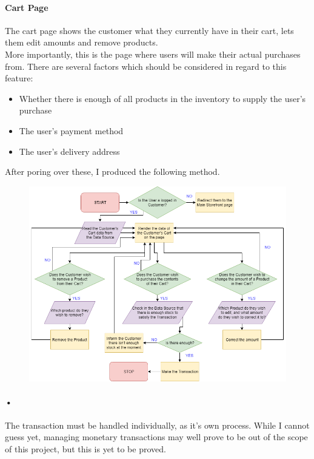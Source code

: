 ﻿\documentclass{article}
\begin{document}
    \paragraph{Cart Page}
    The cart page shows the customer what they currently have in their cart, lets them edit amounts  and remove products.\\
    More importantly, this is the page where users will make their actual purchases from.
    There are several factors which should be considered in regard to this feature:
    \begin{itemize}
    \item Whether there is enough of all products in the inventory to supply the user's purchase
    \item The user's payment method
    \item The user's delivery address
    \end{itemize}
    After poring over these, I produced the following method.
    \begin{figure}[h]
    \includegraphics[width=\textwidth]{cartPage.png}
    \centering
    \end{figure}
    \paragraph{•}
    The transaction must be handled individually, as it's own process.
    While I cannot guess yet, managing monetary transactions may well prove to be out of the scope of this project, but this is yet to be proved.
    \newpage
\end{document}
